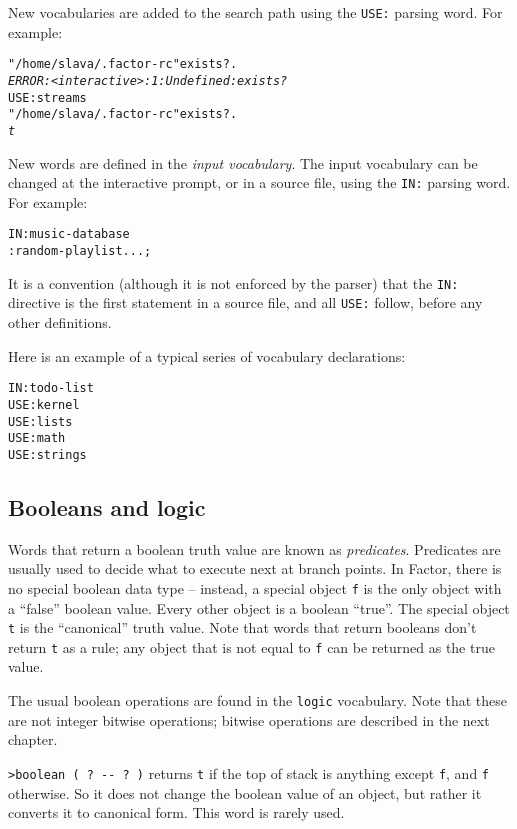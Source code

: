 \documentclass[english]{article}
\begin{document}
New vocabularies are added to the search path using the \texttt{USE:}
parsing word. For example:

\begin{alltt}
"/home/slava/.factor-rc" exists? .
\emph{ERROR: <interactive>:1: Undefined: exists?}
USE: streams
"/home/slava/.factor-rc" exists? .
\emph{t}
\end{alltt}

New words are defined in the \emph{input vocabulary}. The input vocabulary
can be changed at the interactive prompt, or in a source file, using
the \texttt{IN:} parsing word. For example:

\begin{alltt}
IN: music-database
: random-playlist ... ;
\end{alltt}
It is a convention (although it is not enforced by the parser) that
the \texttt{IN:} directive is the first statement in a source file,
and all \texttt{USE:} follow, before any other definitions.

Here is an example of a typical series of vocabulary declarations:

\begin{alltt}
IN: todo-list
USE: kernel
USE: lists
USE: math
USE: strings
\end{alltt}

\subsection{Booleans and logic}

Words that return a boolean truth value are known as \emph{predicates}. Predicates are usually used to decide what to execute next at branch points. In Factor, there is no special boolean data type
-- instead, a special object \texttt{f} is the only object with a
``false'' boolean value. Every other object is a boolean ``true''.
The special object \texttt{t} is the ``canonical'' truth value. Note that words that return booleans don't return \texttt{t} as a rule; any object that is not equal to \texttt{f} can be returned as the true value.

The usual boolean operations are found in the \texttt{logic} vocabulary. Note that these are not integer bitwise operations; bitwise operations are described in the next chapter.

\texttt{>boolean ( ? -{}- ? )} returns \texttt{t} if the top of stack is anything except \texttt{f}, and \texttt{f} otherwise. So it does not change the boolean value of an object, but rather it converts it to canonical form. This word is rarely used.
\end{document}
